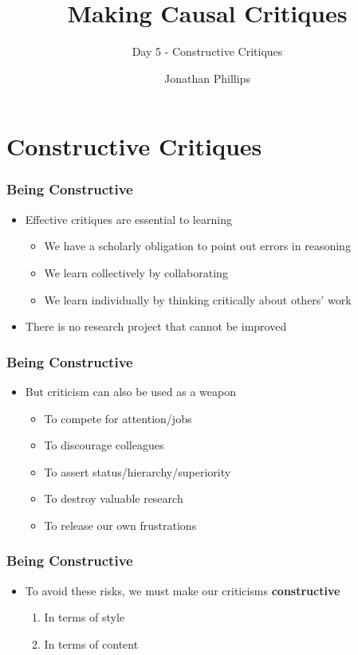 \documentclass[xcolor=x11names,compress]{beamer}\usepackage[]{graphicx}\usepackage[]{color}
\title{Making Causal Critiques}
\subtitle{Day 5 - Constructive Critiques}
\author{Jonathan Phillips}
\renewcommand{\(}{\begin{columns}}
\renewcommand{\)}{\end{columns}}
\newcommand{\<}[1]{\begin{column}{#1}}
\renewcommand{\>}{\end{column}}
\begin{document}
\frame{\titlepage}

\section{Constructive Critiques}

\begin{frame}
\frametitle{Being Constructive}
\begin{itemize}
\item Effective critiques are essential to learning
\pause
\begin{itemize}
\item We have a scholarly obligation to point out errors in reasoning
\pause
\item We learn collectively by collaborating
\pause
\item We learn individually by thinking critically about others' work
\pause
\end{itemize}
\item There is no research project that cannot be improved
\end{itemize}
\end{frame}

\begin{frame}
\frametitle{Being Constructive}
\begin{itemize}
\item But criticism can also be used as a weapon
\pause
\begin{itemize}
\item To compete for attention/jobs
\pause
\item To discourage colleagues
\pause
\item To assert status/hierarchy/superiority
\pause
\item To destroy valuable research
\pause
\item To release our own frustrations
\end{itemize}
\end{itemize}
\end{frame}

\begin{frame}
\frametitle{Being Constructive}
\begin{itemize}
\item To avoid these risks, we must make our criticisms \textbf{constructive}
\pause
\begin{enumerate}
\item In terms of style
\pause
\item In terms of content
\end{enumerate}
\end{itemize}
\end{frame}
\end{document}
